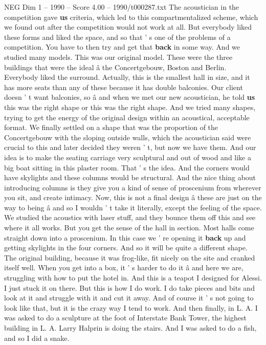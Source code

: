 \begin{textsample}{NEG Dim 1 – 1990 – Score 4.00 – 1990/t000287.txt}
The acoustician in the competition gave \textbf{us} criteria, which led to this compartmentalized scheme, which we found out after the competition would not work at all.
But everybody liked these forms and liked the space, and so that ' s one of the problems of a competition.
You have to then try and get that \textbf{back} in some way.
And we studied many models.
This was our original model.
These were the three buildings that were the ideal â the Concertgebouw, Boston and Berlin.
Everybody liked the surround.
Actually, this is the smallest hall in size, and it has more seats than any of these because it has double balconies.
Our client doesn ' t want balconies, so â and when we met our new acoustician, he told \textbf{us} this was the right shape or this was the right shape.
And we tried many shapes, trying to get the energy of the original design within an acoustical, acceptable format.
We finally settled on a shape that was the proportion of the Concertgebouw with the sloping outside walls, which the acoustician said were crucial to this and later decided they weren ' t, but now we have them.
And our idea is to make the seating carriage very sculptural and out of wood and like a big boat sitting in this plaster room.
That ' s the idea.
And the corners would have skylights and these columns would be structural.
And the nice thing about introducing columns is they give you a kind of sense of proscenium from wherever you sit, and create intimacy.
Now, this is not a final design â these are just on the way to being â and so I wouldn ' t take it literally, except the feeling of the space.
We studied the acoustics with laser stuff, and they bounce them off this and see where it all works.
But you get the sense of the hall in section.
Most halls come straight down into a proscenium.
In this case we ' re opening it \textbf{back} up and getting skylights in the four corners.
And so it will be quite a different shape.
The original building, because it was frog-like, fit nicely on the site and cranked itself well.
When you get into a box, it ' s harder to do it â and here we are, struggling with how to put the hotel in.
And this is a teapot I designed for Alessi.
I just stuck it on there.
But this is how I do work.
I do take pieces and bits and look at it and struggle with it and cut it away.
And of course it ' s not going to look like that, but it is the crazy way I tend to work.
And then finally, in L.
A.
I was asked to do a sculpture at the foot of Interstate Bank Tower, the highest building in L.
A.
Larry Halprin is doing the stairs.
And I was asked to do a fish, and so I did a snake.

\end{textsample}
